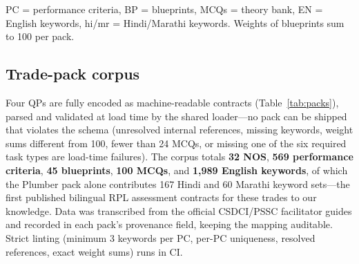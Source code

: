 \documentclass[conference]{IEEEtran}
\begin{document}
\begin{table}[t]
\caption{Trade packs shipped with the platform (contracts, not prose).}
\label{tab:packs}
\centering
\footnotesize
\renewcommand{\arraystretch}{1.15}
\vspace{1pt}
{\footnotesize PC = performance criteria, BP = blueprints, MCQs = theory bank,
EN = English keywords, hi/mr = Hindi/Marathi keywords. Weights of blueprints sum to 100 per pack.}
\end{table}

\subsection{Trade-pack corpus}
Four QPs are fully encoded as machine-readable contracts (Table~\ref{tab:packs}), parsed and
validated at load time by the shared loader---no pack can be shipped that violates the
schema (unresolved internal references, missing keywords, weight sums different from 100,
fewer than 24 MCQs, or missing one of the six required task types are load-time failures).
The corpus totals \textbf{32 NOS}, \textbf{569 performance criteria}, \textbf{45
blueprints}, \textbf{100 MCQs}, and \textbf{1,989 English keywords}, of which the Plumber
pack alone contributes 167 Hindi and 60 Marathi keyword sets---the first published
bilingual RPL assessment contracts for these trades to our knowledge. Data was transcribed
from the official CSDCI/PSSC facilitator guides and recorded in each pack's provenance
field, keeping the mapping auditable. Strict linting (minimum 3 keywords per PC, per-PC
uniqueness, resolved references, exact weight sums) runs in CI.
\end{document}
